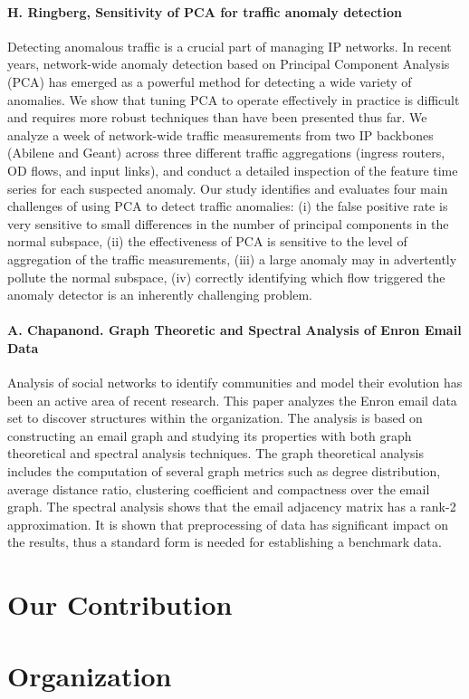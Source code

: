 \paragraph*{H. Ringberg, 
Sensitivity of PCA for traffic anomaly detection}
\cite{ringberg2007sensitivity}
Detecting anomalous traffic is a crucial part of managing IP networks. In recent years, network-wide anomaly detection based on Principal Component Analysis (PCA) has emerged as a powerful method for detecting a wide variety of anomalies. We show that tuning PCA to operate effectively in practice is difficult and requires more robust techniques than have been presented thus far. We analyze a week of network-wide traffic measurements from two IP backbones (Abilene and Geant) across three different traffic aggregations (ingress routers, OD flows, and input links), and conduct a detailed inspection of the feature time series for each suspected anomaly. Our study identifies and evaluates four main challenges of using PCA to detect traffic anomalies: (i) the false positive rate is very sensitive to small differences in the number of principal components in the normal subspace, (ii) the effectiveness of PCA is sensitive to the level of aggregation of the traffic measurements, (iii) a large anomaly may in advertently pollute the normal subspace, (iv) correctly identifying which flow triggered the anomaly detector is an inherently challenging problem.

\paragraph*{A. Chapanond. Graph Theoretic and Spectral Analysis
of Enron Email Data}
\cite{chapanond2005graph}
Analysis of social networks to identify communities and model their evolution has been an active area of recent research. This paper analyzes the Enron email data set to discover structures within the organization. The analysis is based on constructing an email graph and studying its properties with both graph theoretical and spectral analysis techniques. The graph theoretical analysis includes the computation of several graph metrics such as degree distribution, average distance ratio, clustering coefficient and compactness over the email graph. The spectral analysis shows that the email adjacency matrix has a rank-2 approximation. It is shown that preprocessing of data has significant impact on the results, thus a standard form is needed for establishing a benchmark data.

\cite{wei1994time}

\section{Our Contribution}

\section{Organization}
